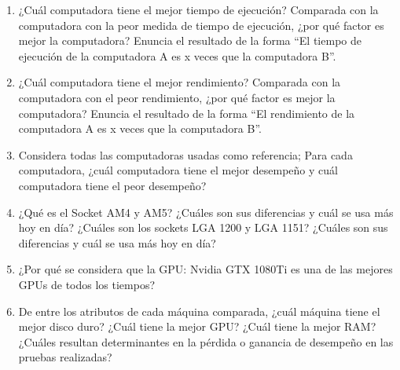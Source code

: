 \documentclass{article}
\begin{document}
\begin{enumerate}
\item ¿Cuál computadora tiene el mejor tiempo de ejecución? Comparada con la computadora con la peor medida de tiempo de ejecución, ¿por qué factor es mejor la computadora? Enuncia el resultado de la forma “El tiempo de ejecución de la computadora A es x veces que la computadora B”.
\item ¿Cuál computadora tiene el mejor rendimiento? Comparada con la computadora con el peor rendimiento, ¿por qué factor es mejor la computadora? Enuncia el resultado de la forma “El rendimiento de la computadora A es x veces que la computadora B”.
\item Considera todas las computadoras usadas como referencia; Para cada computadora, ¿cuál computadora tiene el mejor desempeño y cuál computadora tiene el peor desempeño?
\item ¿Qué es el Socket AM4 y AM5? ¿Cuáles son sus diferencias y cuál se usa más hoy en día? ¿Cuáles son los sockets LGA 1200 y LGA 1151? ¿Cuáles son sus diferencias y cuál se usa más hoy en día?
\item ¿Por qué se considera que la GPU: Nvidia GTX 1080Ti es una de las mejores GPUs de todos los tiempos?
\item De entre los atributos de cada máquina comparada, ¿cuál máquina tiene el mejor disco duro? ¿Cuál tiene la mejor GPU? ¿Cuál tiene la mejor RAM? ¿Cuáles resultan determinantes en la pérdida o ganancia de desempeño en las pruebas realizadas?
\end{enumerate}
\end{document}
